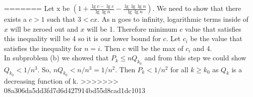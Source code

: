 \documentclass{article}
\begin{document}
=======
Let x be $(1 + \frac{\lg c - \lg e}{\lg\lg n} - \frac{\lg\lg\lg n}{\lg\lg n})$. We need to show that there exists a $c > 1$ such that $3 < cx$. As n goes to infinity, logarithmic terms inside of $x$ will be zeroed out and $x$ will be 1. Therefore minimum $c$ value that satisfies this inequality will be 4 so it is our lower bound for $c$. Let $c_i$ be the value that satisfies the inequality for $n = i$. Then c will be the max of $c_i$ and 4. \\
In subproblem (b) we showed that $P_k \leq nQ_{k_0}$ and from this step we could show $Q_{k_0} < 1/n^3$. So, $nQ_{k_0} < n/n^3 = 1/n^2$. Then $P_k < 1/n^2$ for all $k \geq k_0$ as $Q_k$ is a decreasing function of k.
>>>>>>> 08a306da5dd3fd7d6d427914bd55d8cad1dc1013
\end{document}
